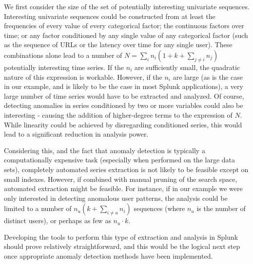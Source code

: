 We first consider the size of the set of potentially interesting univariate sequences. Interesting univariate sequences could be constructed from at least the frequencies of every value of every categorical factor; the continuous factors over time; or any factor conditioned by any single value of any categorical factor (such as the sequence of URLs or the latency over time for any single user). These combinations alone lead to a number of $N = \sum_i n_i (1 + k + \sum_{j \neq i} n_j)$ potentially interesting time series. If the $n_i$ are sufficiently small, the quadratic nature of this expression is workable. However, if the $n_i$ are large (as is the case in our example, and is likely to be the case in most Splunk applications), a very large number of time series would have to be extracted and analyzed. Of course, detecting anomalies in series conditioned by two or more variables could also be interesting - causing the addition of higher-degree terms to the expression of $N$. While linearity could be achieved by disregarding conditioned series, this would lead to a significant reduction in analysis power.

Considering this, and the fact that anomaly detection is typically a computationally expensive task (especially when performed on the large data sets), completely automated series extraction is not likely to be feasible except on small indexes. However, if combined with manual pruning of the search space, automated extraction might be feasible. For instance, if in our example we were only interested in detecting anomalous user patterns, the analysis could be limited to a number of $n_u (k + \sum_{i \neq u} n_i)$ sequences (where $n_u$ is the number of distinct users), or perhaps as few as $n_u \cdot k$.

Developing the tools to perform this type of extraction and analysis in Splunk should prove relatively straightforward, and this would be the logical next step once appropriate anomaly detection methods have been implemented.
